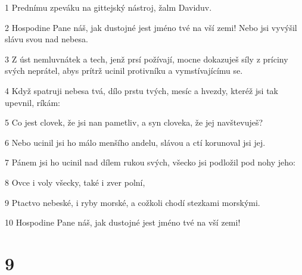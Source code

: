 \par 1 Prednímu zpeváku na gittejský nástroj, žalm Daviduv.
\par 2 Hospodine Pane náš, jak dustojné jest jméno tvé na vší zemi! Nebo jsi vyvýšil slávu svou nad nebesa.
\par 3 Z úst nemluvnátek a tech, jenž prsí požívají, mocne dokazuješ síly z príciny svých neprátel, abys prítrž ucinil protivníku a vymstívajícímu se.
\par 4 Když spatruji nebesa tvá, dílo prstu tvých, mesíc a hvezdy, kteréž jsi tak upevnil, ríkám:
\par 5 Co jest clovek, že jsi nan pametliv, a syn cloveka, že jej navštevuješ?
\par 6 Nebo ucinil jsi ho málo menšího andelu, slávou a ctí korunoval jsi jej.
\par 7 Pánem jsi ho ucinil nad dílem rukou svých, všecko jsi podložil pod nohy jeho:
\par 8 Ovce i voly všecky, také i zver polní,
\par 9 Ptactvo nebeské, i ryby morské, a cožkoli chodí stezkami morskými.
\par 10 Hospodine Pane náš, jak dustojné jest jméno tvé na vší zemi!

\chapter{9}

